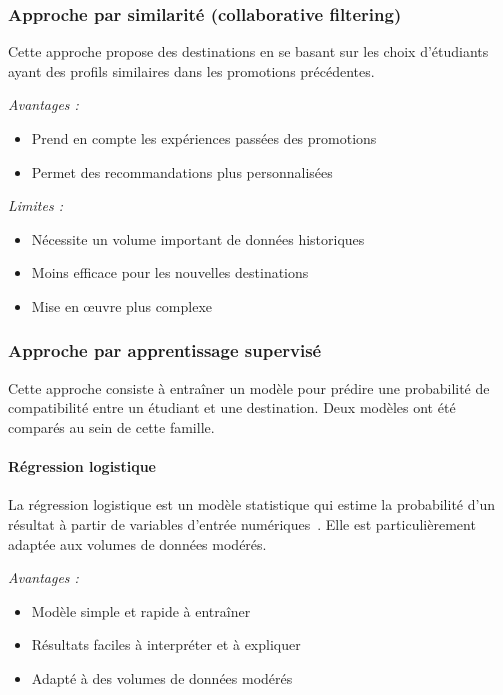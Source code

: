 \subsubsection{Approche par similarité (collaborative filtering)}

Cette approche propose des destinations en se basant sur les choix
d'étudiants ayant des profils similaires dans les promotions précédentes.

\textit{Avantages :}
\begin{itemize}
  \item Prend en compte les expériences passées des promotions
  \item Permet des recommandations plus personnalisées
\end{itemize}

\textit{Limites :}
\begin{itemize}
  \item Nécessite un volume important de données historiques
  \item Moins efficace pour les nouvelles destinations
  \item Mise en œuvre plus complexe
\end{itemize}

\subsubsection{Approche par apprentissage supervisé}

Cette approche consiste à entraîner un modèle pour prédire une probabilité
de compatibilité entre un étudiant et une destination. Deux modèles ont
été comparés au sein de cette famille.

\paragraph{Régression logistique}

La régression logistique est un modèle statistique qui estime la
probabilité d'un résultat à partir de variables d'entrée numériques~\cite{Cox1958}.
Elle est particulièrement adaptée aux volumes de données modérés.

\textit{Avantages :}
\begin{itemize}
  \item Modèle simple et rapide à entraîner
  \item Résultats faciles à interpréter et à expliquer
  \item Adapté à des volumes de données modérés
\end{itemize}

